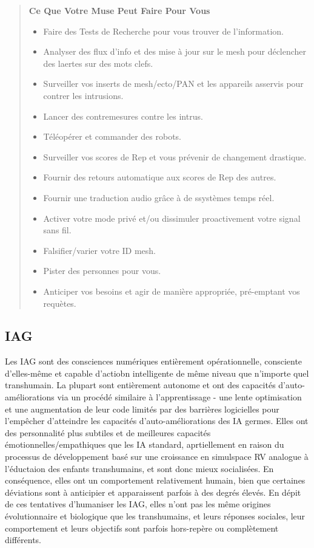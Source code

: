 \begin{quotation} \textbf{Ce Que Votre Muse Peut Faire Pour Vous} \begin{itemize} \item Faire des Tests de Recherche pour vous trouver de l'information. \item Analyser des flux d'info et des mise à jour sur le mesh pour déclencher des laertes sur des mots clefs. \item Surveiller vos inserts de mesh/ecto/PAN et les appareils asservis pour contrer les intrusions. \item Lancer des contremesures contre les intrus. \item Téléopérer et commander des robots. \item Surveiller vos scores de Rep et vous prévenir de changement drastique. \item Fournir des retours automatique aux scores de Rep des autres. \item Fournir une traduction audio grâce à de ssystèmes temps réel. \item Activer votre mode privé et/ou dissimuler proactivement votre signal sans fil. \item Falsifier/varier votre ID mesh. \item Pister des personnes pour vous. \item Anticiper vos besoins et agir de manière appropriée, pré-emptant vos requètes. \end{itemize} \end{quotation} 

\subsection{IAG} 

Les IAG sont des consciences numériques entièrement opérationnelle, consciente d'elles-même et capable d'actiobn intelligente de même niveau que n'importe quel transhumain. La plupart sont entièrement autonome et ont des capacités d'auto-améliorations via un procédé similaire à l'apprentissage - une lente optimisation et une augmentation de leur code limités par des barrières logicielles pour l'empêcher d'atteindre les capacités d'auto-améliorations des IA germes. Elles ont des personnalité plus subtiles et de meilleures capacités émotionnelles/empathiques que les IA standard, aprtiellement en raison du processus de développement basé sur une croissance en simulspace RV analogue à l'éductaion des enfants transhumains, et sont donc mieux socialisées. En conséquence, elles ont un comportement relativement humain, bien que certaines déviations sont à anticipier et apparaissent parfois à des degrés élevés. En dépit de ces tentatives d'humaniser les IAG, elles n'ont pas les même origines évolutionnaire et biologique que les transhumains, et leurs réponses sociales, leur comportement et leurs objectifs sont parfois hors-repère ou complètement différents. 

